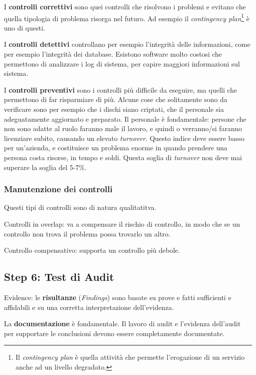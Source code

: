 I \textbf{controlli correttivi} sono quei controlli che risolvono i problemi e 
evitano che quella tipologia di problema risorga nel futuro. Ad esempio il 
\textit{contingency plan}\footnote{Il \textit{contingency plan} è quella 
attività che permette l'erogazione di un servizio anche ad un livello 
degradato.} è uno di questi.

I \textbf{controlli detettivi} controllano per esempio l'integrità delle 
informazioni, come per esempio l'integrità dei database. Esistono software 
molto costosi che permettono di analizzare i log di sistema, per capire 
maggiori informazioni sul sistema.

I \textbf{controlli preventivi} sono i controlli più difficile da eseguire, ma 
quelli che permettono di far risparmiare di più. Alcune cose che solitamente 
sono da verificare sono per esempio che i dischi siano criptati, che il 
personale sia adeguatamente aggiornato e preparato.
Il personale è fondamentale: persone che non sono adatte al ruolo faranno male 
il lavoro, e quindi o verranno/si faranno licenziare subito, causando un 
elevato \textit{turnover}. Questo indice deve essere basso per un'azienda, e 
costituisce un problema enorme in quando prendere una persona costa risorse, in 
tempo e soldi. Questa soglia di \textit{turnover} non deve mai superare la 
soglia del 5-7\%.

\subsubsection{Manutenzione dei controlli}
Questi tipi di controlli sono di natura qualitatitva.

Controlli in overlap: va a compensare il rischio di controllo, in modo che se 
un controllo non trova il problema possa trovarlo un altro.

Controllo compensativo: supporta un controllo più debole.



\subsection{Step 6: Test di Audit}


Evidence: le \textbf{risultanze} (\emph{Findings}) sono basate su prove e fatti 
sufficienti e affidabili e su una corretta interpretazione dell'evidenza. 

La \textbf{documentazione} è fondamentale. Il lavoro di audit e l'evidenza 
dell'audit per supportare le conclusioni devono essere completamente 
documentate.


